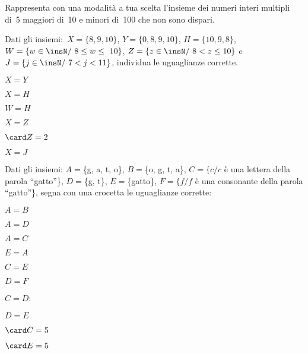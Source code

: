 \begin{esercizio}
\label{ese:6.26}
Rappresenta con una modalità a tua scelta l'insieme dei numeri interi multipli 
di~5 maggiori di~10 e minori di~100 che non
sono dispari.
\end{esercizio}

\begin{esercizio}
\label{ese:6.27}
Dati gli insiemi:~\(X=\{8, 9, 10\}\), \(Y=\{0, 8, 9, 10\}\), \(H=\{10, 9, 8\}\),
\(W=\{w\in\insN/\ 8\le w\le~10\}\), \(Z=\{z\in\insN/\ 8<z\le10\}\) 
e~\(J=\{j\in\insN/\ 7<j<11\}\),
individua le uguaglianze corrette.

\vspace{-.6em}
\begin{multicols}{3}
\begin{enumeratea}
\item \(X = Y\)
\item \(X= H\)
\item \(W = H\)
\item \(X = Z\)
\item \(\card Z=2\)
\item \(X = J\)
\end{enumeratea}
\end{multicols}

\vspace{-1em}
\end{esercizio}

\begin{esercizio}
\label{ese:6.28}
Dati gli insiemi:
\(A=\)\{g, a, t, o\}, \(B=\)\{o, g, t, a\}, \(C=\{c/c\) è una lettera della parola 
``gatto''\},
\(D=\)\{g, t\}, \(E=\)\{gatto\}, \(F=\{f / f\) è una consonante della parola 
``gatto''\},
segna con una crocetta le uguaglianze corrette:

\vspace{-.6em}
\begin{multicols}{4}
\begin{enumeratea}
 \item \(A = B\)
 \item \(A = D\)
 \item \(A = C\)
 \item \(E = A\)
 \item \(C = E\)
 \item \(D = F\)
 \item \(C = D\):
 \item \(D = E\)
 \columnbreak
 \item \(\card C=5\)
 \item \(\card E=5\)
\end{enumeratea}
\end{multicols}

\vspace{-1em}
\end{esercizio}

